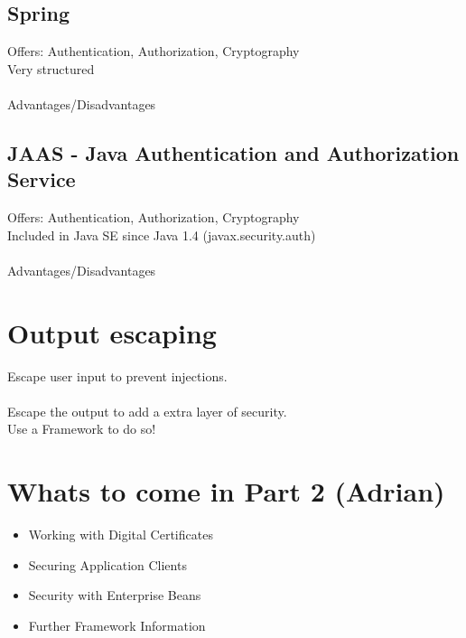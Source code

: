 \documentclass[12pt,a4paper]{report}
\begin{document}
\subsection{Spring}
Offers: Authentication, Authorization, Cryptography\\
Very structured\\\\
Advantages/Disadvantages\\

\subsection{JAAS - Java Authentication and Authorization Service}
Offers: Authentication, Authorization, Cryptography\\
Included in Java SE since Java 1.4 (javax.security.auth)\\\\
Advantages/Disadvantages\\

\section{Output escaping}
Escape user input to prevent injections.\\
\\
Escape the output to add a extra layer of security.\\
Use a Framework to do so!\\

\section{Whats to come in Part 2 (Adrian)}
\begin{itemize}
	\item Working with Digital Certificates\\
	\item Securing Application Clients\\
	\item Security with Enterprise Beans\\
	\item Further Framework Information\\
\end{itemize}
\end{document}
